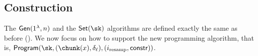 \subsection{Construction}
The ${\sf Gen}(1^\lambda, n)$
and the ${\sf Set}(\sk)$ algorithms are defined
exactly the same as before ().
We now focus 
on how to support the new programming algorithm, that is,  
${\sf Program}(\sk, (\chunk(x), \delta_\ell), 
(i_{\rm resamp}, {\sf constr}))$.






